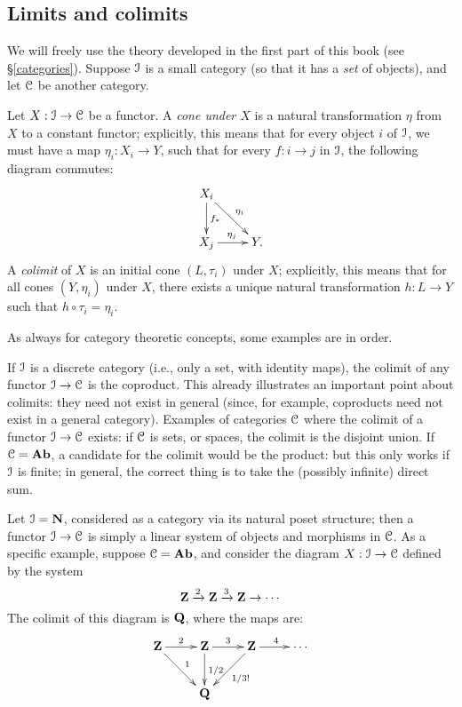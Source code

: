 \subsection{Limits and colimits}
We will freely use the theory developed in the first part of this book (see \S \ref{categories}).
Suppose $\mathcal I$ is a small category (so that it has a \emph{set} of objects),
and let $\mathcal C$ be another category.
\begin{definition}
    Let $X:\mathcal I\to\mathcal C$ be a functor.
    A \emph{cone under $X$} is a natural transformation $\eta$ from $X$ to a constant functor;
    explicitly, this means that for every object $i$ of $\mathcal I$, we must have a map $\eta_i: X_i\to Y$,
    such that for every $f:i\to j$ in $\mathcal I$, the following diagram commutes:
    \begin{equation*}
	\xymatrix{
	    X_i\ar[d]^{f_\ast}\ar[dr]^{\eta_i} & \\
	    X_j\ar[r]^{\eta_j} & Y.
	    }
    \end{equation*}
    A \emph{colimit} of $X$ is an initial cone $(L,\tau_i)$ under $X$;
    explicitly, this means that for all cones $(Y,\eta_i)$ under $X$,
    there exists a unique natural transformation $h:L\to Y$ such that $h\circ \tau_i = \eta_i$.
\end{definition}
As always for category theoretic concepts, some examples are in order.
\begin{example}\label{coproductsarecolimits}
    If $\mathcal I$ is a discrete category (i.e., only a set, with identity maps), the colimit of any functor $\mathcal I\to\mathcal C$
    is the coproduct. This already illustrates an important point about colimits: they need not exist in general
    (since, for example, coproducts need not exist in a general category).
    Examples of categories $\mathcal C$ where the colimit of a functor $\mathcal I\to\mathcal C$ exists:
    if $\mathcal C$ is sets, or spaces, the colimit is the disjoint union.
    If $\mathcal C=\mathbf{Ab}$, a candidate for the colimit would be the product:
    but this only works if $\mathcal I$ is finite; in general, the correct thing is to take the (possibly infinite) direct sum.
\end{example}
\begin{example}
    Let $\mathcal I = \mathbf{N}$, considered as a category via its natural poset structure;
    then a functor $\mathcal I\to \mathcal C$ is simply a linear system of objects and morphisms in $\mathcal C$.
    As a specific example, suppose $\mathcal C = \mathbf{Ab}$, and
    consider the diagram $X:\mathcal I \to \mathcal C$ defined by the system
    $$\mathbf Z\xrightarrow{2}\mathbf Z\xrightarrow{3}\mathbf Z\to\cdots$$
    The colimit of this diagram is $\mathbf Q$, where the maps are:
    \begin{equation*}
	\xymatrix{
	    \Z\ar[r]^2\ar[dr]^1 & \Z\ar[r]^3\ar[d]^{1/2} & \Z\ar[r]^4\ar[dl]^{1/3!} & \cdots\\
	    & \QQ & &
	    }
    \end{equation*}
\end{example}
